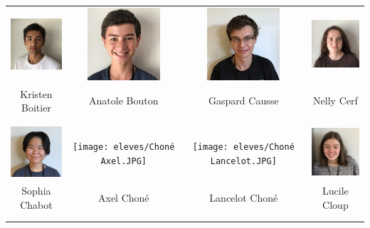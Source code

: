 \begin{center}
\begin{tabular}{cccc}
\includegraphics[angle=270,origin=c, width=27mm]{eleves/Boitier Kristen.JPG} &
\includegraphics[angle=270,origin=c, width=27mm]{eleves/Bouton Anatole.JPG} &
\includegraphics[angle=270,origin=c, width=27mm]{eleves/Causse Gaspard.JPG} &
\includegraphics[angle=270,origin=c, width=27mm]{eleves/Cerf Nelly.JPG} \\
Kristen Boitier & Anatole Bouton & Gaspard Causse & Nelly Cerf \\ \\ \\

\includegraphics[angle=270,origin=c, width=27mm]{eleves/Chabot Sophia.JPG} &
\texttt{[image: eleves/Choné Axel.JPG]} &
\texttt{[image: eleves/Choné Lancelot.JPG]} &
\includegraphics[angle=270,origin=c, width=27mm]{eleves/Cloup Lucile.JPG} \\
Sophia Chabot & Axel Choné & Lancelot Choné & Lucile Cloup \\ \\ \\


\end{tabular}
\end{center}
